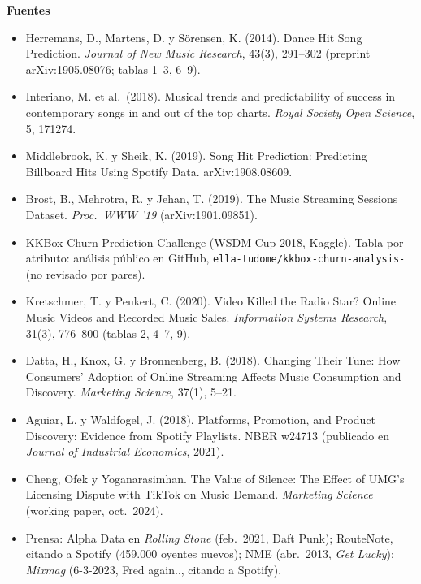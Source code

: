 \documentclass[10pt,a4paper]{article}
\begin{document}
\normalsize
\vspace{8pt}
\textbf{Fuentes}
\footnotesize\sloppy
\begin{itemize}[leftmargin=*,itemsep=0pt,topsep=0pt]
\item Herremans, D., Martens, D. y Sörensen, K. (2014). Dance Hit Song Prediction. \emph{Journal of New Music Research}, 43(3), 291--302 (preprint arXiv:1905.08076; tablas 1--3, 6--9).
\item Interiano, M. et al.\ (2018). Musical trends and predictability of success in contemporary songs in and out of the top charts. \emph{Royal Society Open Science}, 5, 171274.
\item Middlebrook, K. y Sheik, K. (2019). Song Hit Prediction: Predicting Billboard Hits Using Spotify Data. arXiv:1908.08609.
\item Brost, B., Mehrotra, R. y Jehan, T. (2019). The Music Streaming Sessions Dataset. \emph{Proc.\ WWW '19} (arXiv:1901.09851).
\item KKBox Churn Prediction Challenge (WSDM Cup 2018, Kaggle). Tabla por atributo: análisis público en GitHub, \texttt{ella-tudome/kkbox-churn-analysis-} (no revisado por pares).
\item Kretschmer, T. y Peukert, C. (2020). Video Killed the Radio Star? Online Music Videos and Recorded Music Sales. \emph{Information Systems Research}, 31(3), 776--800 (tablas 2, 4--7, 9).
\item Datta, H., Knox, G. y Bronnenberg, B. (2018). Changing Their Tune: How Consumers' Adoption of Online Streaming Affects Music Consumption and Discovery. \emph{Marketing Science}, 37(1), 5--21.
\item Aguiar, L. y Waldfogel, J. (2018). Platforms, Promotion, and Product Discovery: Evidence from Spotify Playlists. NBER w24713 (publicado en \emph{Journal of Industrial Economics}, 2021).
\item Cheng, Ofek y Yoganarasimhan. The Value of Silence: The Effect of UMG's Licensing Dispute with TikTok on Music Demand. \emph{Marketing Science} (working paper, oct.\ 2024).
\item Prensa: Alpha Data en \emph{Rolling Stone} (feb.\ 2021, Daft Punk); RouteNote, citando a Spotify (459.000 oyentes nuevos); NME (abr.\ 2013, \emph{Get Lucky}); \emph{Mixmag} (6-3-2023, Fred again.., citando a Spotify).
\end{itemize}
\end{document}
